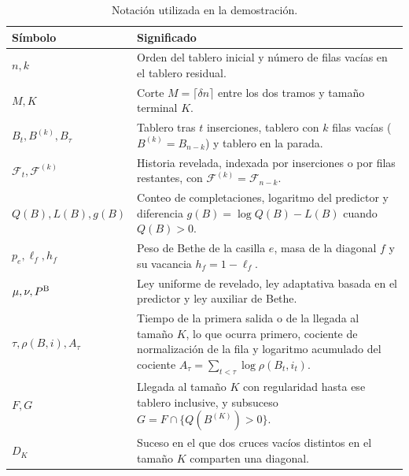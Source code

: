 \begin{table}[!htbp]
\centering\small
\caption{Notación utilizada en la demostración.}
\label{tab:proof-notation}
\begin{tabular}{@{}p{.29\linewidth}>{\raggedright\arraybackslash}p{.65\linewidth}@{}}
\toprule
Símbolo & Significado \\
\midrule
$n,k$ & Orden del tablero inicial y número de filas vacías en el tablero residual. \\
$M,K$ & Corte $M=\lceil\delta n\rceil$ entre los dos tramos y tamaño terminal $K$. \\
$B_t,B^{(k)},B_\tau$ & Tablero tras $t$ inserciones, tablero con $k$ filas vacías
($B^{(k)}=B_{n-k}$) y tablero en la parada. \\
$\mathcal F_t,\mathcal F^{(k)}$ & Historia revelada, indexada por inserciones o por filas restantes,
con $\mathcal F^{(k)}=\mathcal F_{n-k}$. \\
\addlinespace[.22em]
$Q(B),L(B),g(B)$ & Conteo de completaciones, logaritmo del predictor y diferencia
$g(B)=\log Q(B)-L(B)$ cuando $Q(B)>0$. \\
$p_e,\ell_f,h_f$ & Peso de Bethe de la casilla $e$, masa de la diagonal $f$ y su vacancia
$h_f=1-\ell_f$. \\
\addlinespace[.22em]
$\mu,\nu,P^{\rm B}$ & Ley uniforme de revelado, ley adaptativa basada en el predictor
y ley auxiliar de Bethe. \\
$\tau,\rho(B,i),A_\tau$ & Tiempo de la primera salida o de la llegada al tamaño $K$, lo que ocurra
primero, cociente de normalización de la fila y logaritmo acumulado del cociente
$A_\tau=\sum_{t<\tau}\log\rho(B_t,i_t)$. \\
\addlinespace[.22em]
$F,G$ & Llegada al tamaño $K$ con regularidad hasta ese tablero inclusive, y subsuceso
$G=F\cap\{Q(B^{(K)})>0\}$. \\
$D_K$ & Suceso en el que dos cruces vacíos distintos en el tamaño $K$ comparten una diagonal. \\
\bottomrule
\end{tabular}
\end{table}
